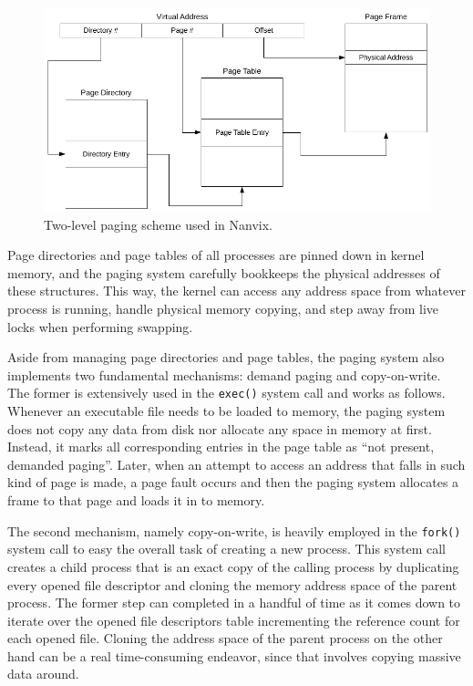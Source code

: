 \documentclass[10pt,a4paper]{article}
\begin{document}
\begin{figure}
	\centering
	\includegraphics[scale=0.85]{img/paging-scheme}
	\caption{Two-level paging scheme used in Nanvix.}
	\label{figure: paging scheme}
\end{figure}

Page directories and page tables of all processes are pinned down in kernel memory, and the paging system carefully bookkeeps the physical addresses of these structures. This way, the kernel can access any address space from whatever process is running, handle physical memory copying, and step away from live locks when performing swapping.

Aside from managing page directories and page tables, the paging system also implements two fundamental mechanisms: demand paging and copy-on-write. The former is extensively used in the \texttt{exec()} system call and works as follows. Whenever an executable file needs to be loaded to memory, the paging system does not copy any data from disk nor allocate any space in memory at first. Instead, it marks all corresponding entries in the page table as ``not present, demanded paging''. Later, when an attempt to access an address that falls in such kind of page is made, a page fault occurs and then the paging system allocates a frame to that page and loads it in to memory. 

The second mechanism, namely copy-on-write, is heavily employed in the \texttt{fork()} system call to easy the overall task of creating a new process. This system call creates a child process that is an exact copy of the calling process by duplicating every opened file descriptor and cloning the memory address space of the parent process. The former step can completed in a handful of time as it comes down to iterate over the opened file descriptors table incrementing the reference count for each opened file. Cloning the address space of the parent process on the other hand can be a real time-consuming endeavor, since that involves copying massive data around.



\printbibliography
\end{document}
